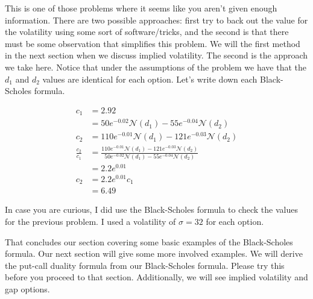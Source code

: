 \documentclass{ximera}
\begin{document}
\begin{solution}
This is one of those problems where it seems like you aren't given enough information. There are two possible approaches: first try to back out the value for the volatility using some sort of software/tricks, and the second is that there must be some observation that simplifies this problem. We will the first method in the next section when we discuss implied volatility. The second is the approach we take here. Notice that under the assumptions of the problem we have that the $d_1$ and $d_2$ values are identical for each option. Let's write down each Black-Scholes formula.

	\begin{align*}
	c_1 			&=2.92\\
				&=50e^{-0.02}\mathcal{N}(d_1)-55e^{-0.04}\mathcal{N}(d_2)\\
	c_2 			&=110e^{-0.01}\mathcal{N}(d_1)-121e^{-0.03}\mathcal{N}(d_2)\\
	\frac{c_2}{c_1} 	&=\frac{110e^{-0.01}\mathcal{N}(d_1)-121e^{-0.03}\mathcal{N}(d_2)}{50e^{-0.02}\mathcal{N}(d_1)-55e^{-0.04}\mathcal{N}(d_2)}\\
				&=2.2e^{0.01}\\
	c_2 			&=2.2e^{0.01}c_1\\
				&=6.49
	\end{align*}

\end{solution}

In case you are curious, I did use the Black-Scholes formula to check the values for the previous problem. I used a volatility of $\sigma=32$ for each option. 

That concludes our section covering some basic examples of the Black-Scholes formula. Our next section will give some more involved examples. We will derive the put-call duality formula from our Black-Scholes formula. Please try this before you proceed to that section. Additionally, we will see implied volatility and gap options.
\end{document}

